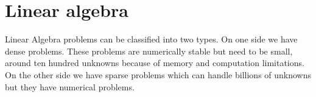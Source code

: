 \section{Linear algebra}

Linear Algebra problems can be classified into two types.
On one side we have dense problems.
These problems are numerically stable but need to be small,
around ten hundred unknowns because of memory and computation limitations.
On the other side we have sparse problems which can handle billions of unknowns
but they have numerical problems.


